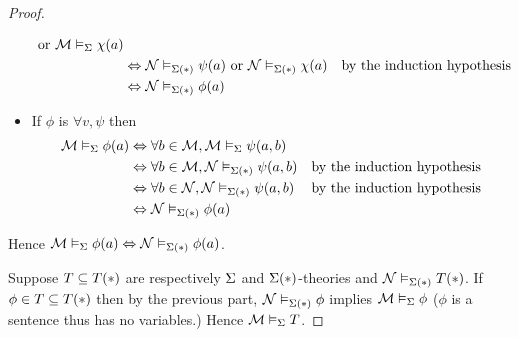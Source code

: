 \begin{proof}
\begin{itemize}
\begin{align*}
                \text{ or } \mathcal{M} \vDash_{\Sigma} \chi(a)\\
                    &\Leftrightarrow \mathcal{N} \vDash_{\Sigma(*)} \psi(a) \text{ or } 
                    \mathcal{N} \vDash_{\Sigma(*)} \chi(a)
                    & \text{by the induction hypothesis}\\
                    & \Leftrightarrow \mathcal{N} \vDash_{\Sigma(*)} \phi(a) 
            \end{align*}
        \item If $\phi$ is $\forall v, \psi$ then
        \begin{align*}
            \mathcal{M} \vDash_{\Sigma} \phi(a) &\Leftrightarrow \forall b \in {\mathcal{M}}, 
            \mathcal{M} \vDash_{\Sigma} \psi(a,b)\\
                &\Leftrightarrow \forall b \in {\mathcal{M}}, \mathcal{N} \vDash_{\Sigma(*)} \psi(a,b)
                & \text{by the induction hypothesis}\\
                &\Leftrightarrow \forall b \in {\mathcal{N}}, \mathcal{N} \vDash_{\Sigma(*)} \psi(a,b)
                & \text{by the induction hypothesis}\\
                & \Leftrightarrow \mathcal{N} \vDash_{\Sigma(*)} \phi(a) 
        \end{align*}
    \end{itemize}
    Hence $\mathcal{M} \vDash_{\Sigma} \phi(a) \Leftrightarrow \mathcal{N} \vDash_{\Sigma(*)} \phi(a)$.

    Suppose $T \subseteq T(*)$ are respectively $\Sigma$ and $\Sigma(*)$-theories and 
    $\mathcal{N} \vDash_{\Sigma(*)} T(*)$.
    If $\phi \in T \subseteq T(*)$ then by the previous part, 
    $\mathcal{N} \vDash_{\Sigma(*)} \phi$ implies $\mathcal{M} \vDash_{\Sigma} \phi$
    ($\phi$ is a sentence thus has no variables.)
    Hence $\mathcal{M} \vDash_{\Sigma} T$.
\end{proof}

